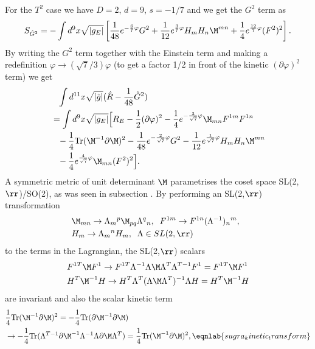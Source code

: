 For the $T^2$ case we have $D=2$, $d=9$, $s=-1/7$ and we get the $G^2$ term as  
\begin{equation}
S_{\hat G^2} = - \int d^9x \sqrt{|g_E|}\left[\frac{1}{48}e^{-\frac{6}{7}\varphi}G^2+\frac{1}{12}e^{\frac{3}{7}\varphi}H_mH_n\M^{mn}+\frac{1}{4}e^{\frac{12}{7}\varphi}(F^2)^2\right].
\end{equation}
By writing the $G^2$ term together with the Einstein term and making a redefinition $\varphi \rightarrow (\sqrt{7}/3)\varphi$ (to get a factor 1/2 in front of the kinetic $(\partial\varphi)^2$ term) we get
\begin{align}
&\phantom{=}\int d^{11}x \sqrt{|\hat{g}|} (\hat{R}-{1 \over 48}\hat{G}^2) \nonumber \\
&=\int d^9x \sqrt{|g_E|} \Big{[} R_E - {1 \over 2}(\partial \varphi)^2-{1 \over 4}e^{-\frac{3}{\sqrt 7}\varphi}\M_{mn}F^{1m}F^{1n} \nonumber \\
&\phantom{=}-{1 \over 4}\mbox{Tr}(\M^{-1}\partial \M)^2 - {1 \over 48}e^{-\frac{2}{\sqrt 7}\varphi}G^2 - {1 \over 12}e^{\frac{1}{\sqrt 7}\varphi}H_mH_n\M^{mn} \nonumber \\
&\phantom{=}- {1 \over 4}e^{\frac{4}{\sqrt 7}\varphi}\M_{mn}(F^2)^2\Big{]}.
\label{tjolahopp}
\end{align}
A symmetric metric of unit determinant $\M$ parametrises the coset space SL(2,$\rr$)/SO(2), as was seen in subsection .
By performing an SL(2,$\rr$) transformation
\begin{align}
&\M_{mn}\rightarrow\Lambda{_m}^p \M_{pq} \Lambda{^q}_n,\;\; F^{1m}\rightarrow F^{1n}(\Lambda^{-1}){_n}^m,\;\; \nonumber \\
&H_m\rightarrow \Lambda{_m}^nH_m,\;\; \Lambda \in SL(2,\rr)
\end{align}  
to the terms in the Lagrangian, the SL(2,$\rr$) scalars
\begin{align}
&F^{1T}\M F^{1}\rightarrow F^{1T}\Lambda^{-1}\Lambda \M
\Lambda^T\Lambda^{T-1}F^1 = F^{1T}\M F^{1}\nonumber\\
&H^{T}\M^{-1}H\rightarrow H^{T}\Lambda^T(\Lambda \M \Lambda^T)^{-1}\Lambda H = H^{T}\M^{-1}H 
\end{align}
are invariant and also the scalar kinetic term
\begin{align}
&\frac{1}{4}\mbox{Tr}(\M^{-1}\partial \M)^2 = -\frac{1}{4}\mbox{Tr}(\partial \M^{-1}\partial \M) \nonumber \\
&\rightarrow %
-\frac{1}{4}\mbox{Tr}(\Lambda^{T-1}\partial \M^{-1} \Lambda^{-1}\Lambda \partial \M \Lambda^T) = \frac{1}{4}\mbox{Tr}(\M^{-1}\partial \M)^2,
\eqnlab{sugra_kinetic_transform}
\end{align}
